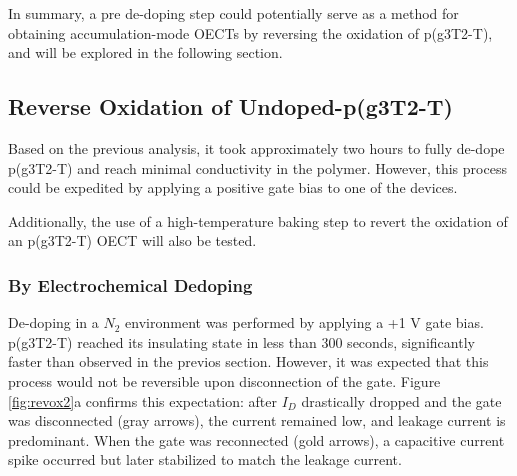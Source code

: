 In summary, a pre de-doping step could potentially serve as a method for obtaining accumulation-mode OECTs by reversing the oxidation of p(g3T2-T), and will be explored in the following section.

\subsection{Reverse Oxidation of Undoped-p(g3T2-T)}
Based on the previous analysis, it took approximately two hours to fully de-dope p(g3T2-T) and reach minimal conductivity %
in the polymer. However, this process could be expedited by applying a positive gate bias to one of the devices.

Additionally, the use of a high-temperature baking step to revert the oxidation of an p(g3T2-T) OECT %
will also be tested.   

\subsubsection{By Electrochemical Dedoping}
De-doping in a $N_{2}$ environment was performed by applying a +1 V gate bias. p(g3T2-T) reached its insulating state in less than 300 seconds, significantly faster than observed in the previos section. However, it was expected that this process would not be reversible upon disconnection of the gate. Figure \ref{fig:revox2}a confirms this expectation: after $I_{D}$ drastically dropped and the gate was disconnected (gray arrows), the current remained low, and leakage current is predominant. When the gate was reconnected (gold arrows), a capacitive current spike occurred but later stabilized to match the leakage current.

